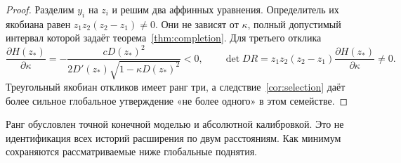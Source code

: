 \begin{proof}
{Разделим $y_i$ на $z_i$ и решим два аффинных уравнения. Определитель их якобиана равен $z_1z_2(z_2-z_1)\ne0$. Они не зависят от $\kappa$, полный допустимый интервал которой задаёт теорема~\ref{thm:completion}. Для третьего отклика}
\begin{equation}\label{eq:rank}
 \frac{\partial H(z_*)}{\partial\kappa}
 =-\frac{cD(z_*)^2}{2D'(z_*)\sqrt{1-\kappa D(z_*)^2}}<0,\qquad
 \det DR=z_1z_2(z_2-z_1)\frac{\partial H(z_*)}{\partial\kappa}\ne0.
\end{equation}
{Треугольный якобиан откликов имеет ранг три, а следствие~\ref{cor:selection} даёт более сильное глобальное утверждение «не более одного» в этом семействе.}
\end{proof}
{Ранг обусловлен точной конечной моделью и абсолютной калибровкой. Это не идентификация всех историй расширения по двум расстояниям. Как минимум сохраняются рассматриваемые ниже глобальные поднятия.}


